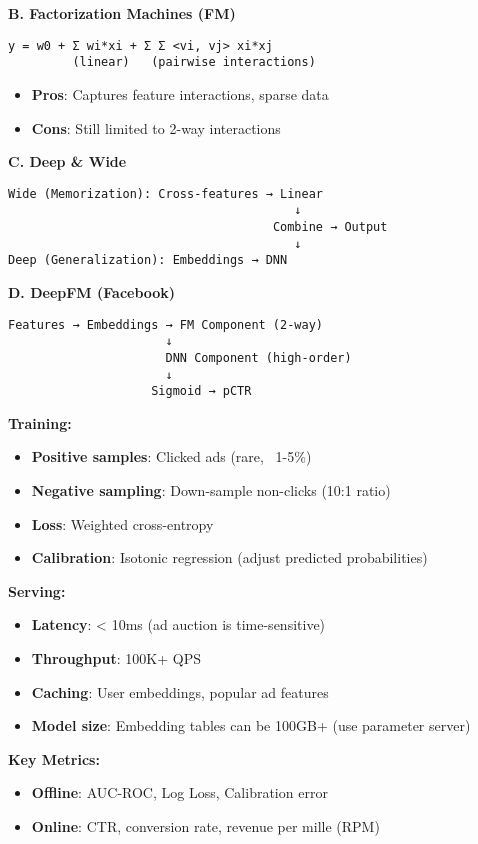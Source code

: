 \documentclass[8pt,landscape]{article}
\begin{document}
\begin{multicols}{3}
\textbf{B. Factorization Machines (FM)}
\begin{verbatim}
y = w0 + Σ wi*xi + Σ Σ <vi, vj> xi*xj
         (linear)   (pairwise interactions)
\end{verbatim}
\begin{itemize}
\item \textbf{Pros}: Captures feature interactions, sparse data
\item \textbf{Cons}: Still limited to 2-way interactions
\end{itemize}

\textbf{C. Deep \& Wide}
\begin{verbatim}
Wide (Memorization): Cross-features → Linear
                                        ↓
                                     Combine → Output
                                        ↓
Deep (Generalization): Embeddings → DNN
\end{verbatim}

\textbf{D. DeepFM (Facebook)}
\begin{verbatim}
Features → Embeddings → FM Component (2-way)
                      ↓
                      DNN Component (high-order)
                      ↓
                    Sigmoid → pCTR
\end{verbatim}

\textbf{Training:}
\begin{itemize}
\item \textbf{Positive samples}: Clicked ads (rare, ~1-5\%)
\item \textbf{Negative sampling}: Down-sample non-clicks (10:1 ratio)
\item \textbf{Loss}: Weighted cross-entropy
\item \textbf{Calibration}: Isotonic regression (adjust predicted probabilities)
\end{itemize}

\textbf{Serving:}
\begin{itemize}
\item \textbf{Latency}: < 10ms (ad auction is time-sensitive)
\item \textbf{Throughput}: 100K+ QPS
\item \textbf{Caching}: User embeddings, popular ad features
\item \textbf{Model size}: Embedding tables can be 100GB+ (use parameter server)
\end{itemize}

\textbf{Key Metrics:}
\begin{itemize}
\item \textbf{Offline}: AUC-ROC, Log Loss, Calibration error
\item \textbf{Online}: CTR, conversion rate, revenue per mille (RPM)
\end{itemize}


\end{multicols}
\end{document}
